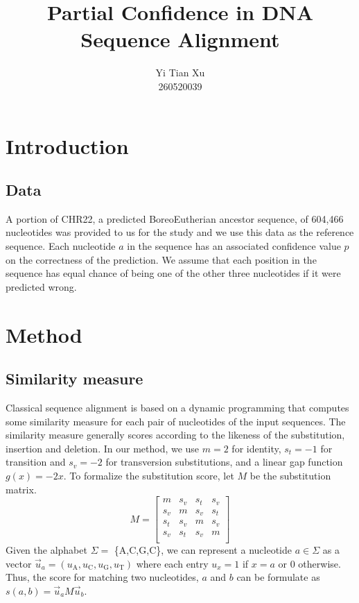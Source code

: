 \documentclass{article}
\begin{document}
\title{Partial Confidence in DNA Sequence Alignment}
\author{Yi Tian Xu\\260520039}

\maketitle

\abstract{}


\section{Introduction}


\subsection{Data}

A portion of CHR22, a predicted BoreoEutherian ancestor sequence, of 604,466 nucleotides was provided to us for the study and we use this data as the reference sequence. Each nucleotide $a$ in the sequence has an associated confidence value $p$ on the correctness of the prediction. We assume that each position in the sequence has equal chance of being one of the other three nucleotides if it were predicted wrong. 

\section{Method}

\subsection{Similarity measure}

Classical sequence alignment is based on a dynamic programming that computes some similarity measure for each pair of nucleotides of the input sequences. The similarity measure generally scores according to the likeness of the substitution, insertion and deletion. In our method, we use $m = 2$ for identity, $s_t = -1$ for transition and $s_v = -2$ for transversion substitutions, and a linear gap function $g(x)=-2x$. To formalize the substitution score, let $M$ be the substitution matrix. 
\begin{equation}
	M = \begin{bmatrix}
		m & s_v & s_t & s_v\\
		s_v & m & s_v & s_t\\
		s_t & s_v & m & s_v\\
		s_v & s_t & s_v & m\\
	\end{bmatrix}
\end{equation}
Given the alphabet $\Sigma =$ \{A,C,G,C\}, we can represent a nucleotide $a \in \Sigma$ as a vector $\vec{u}_a = (u_{\mbox{A}}, u_{\mbox{C}}, u_{\mbox{G}}, u_{\mbox{T}})$ where each entry $u_x = 1$ if $x = a$ or 0 otherwise. Thus, the score for matching two nucleotides, $a$ and $b$ can be formulate as $s(a,b) = \vec{u}_aM\vec{u}_b$.
\end{document}
